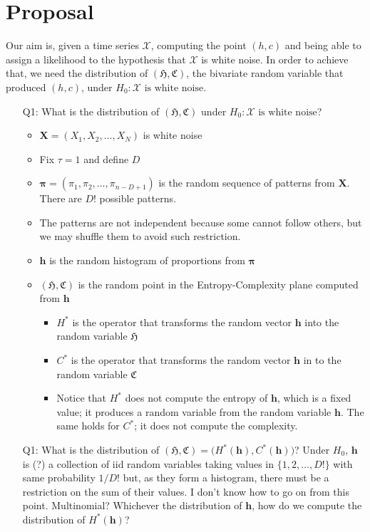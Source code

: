 \documentclass[12pt]{article}
\begin{document}
\section{Proposal}

Our aim is, given a time series $\mathcal X$, computing the point $(h,c)$ and being able to assign a likelihood to the hypothesis that $\mathcal X$ is white noise.
In order to achieve that, we need the distribution of $(\mathfrak{H},\mathfrak{C})$, the bivariate random  variable that produced $(h,c)$, under $H_0:\mathcal X\text { is white noise}$.

\begin{itemize}
\item[Q1:] What is the distribution of $(\mathfrak{H},\mathfrak{C})$ under $H_0:\mathcal X\text { is white noise}$?
\begin{itemize}
	\item $\bm X = (X_1,X_2,\dots,X_N)$ is white noise
	\item Fix $\tau=1$ and define $D$
	\item $\bm \pi=(\pi_1,\pi_2,\dots,\pi_{n-D+1})$ is the random sequence of patterns from $\bm X$. There are $D!$ possible patterns.
	\item The patterns are not independent because some cannot follow others, but we may shuffle them to avoid such restriction.
	\item $\bm h$ is the random histogram of proportions from $\bm \pi$
	\item $(\mathfrak{H},\mathfrak{C})$ is the random point in the Entropy-Complexity plane computed from $\bm h$
	\begin{itemize}	
		\item $H^*$ is the operator that transforms the random vector $\bm h$ into the random variable $\mathfrak{H}$
		\item $C^*$ is the operator that transforms the random vector $\bm h$ in to the random variable $\mathfrak{C}$
		\item Notice that $H^*$ does not compute the entropy of $\bm h$, which is a fixed value; it produces a random variable from the random variable $\bm h$. The same holds for $C^*$; it does not compute the complexity.
	\end{itemize}
\end{itemize}
\item[Q1:] What is the distribution of $
	(\mathfrak{H},\mathfrak{C}) = 
	\big(H^*(\bm h),C^*(\bm h)\big)$? Under $H_0$, $\bm h$ is (?) a collection of iid random variables taking values in $\{1, 2,\dots, D!\}$ with same probability $1/D!$ but, as they form a histogram, there must be a restriction on the sum of their values. I don't know how to go on from this point. Multinomial? Whichever the distribution of $\bm h$, how do we compute the distribution of $H^*(\bm h)$?

\end{itemize}
\end{document}
